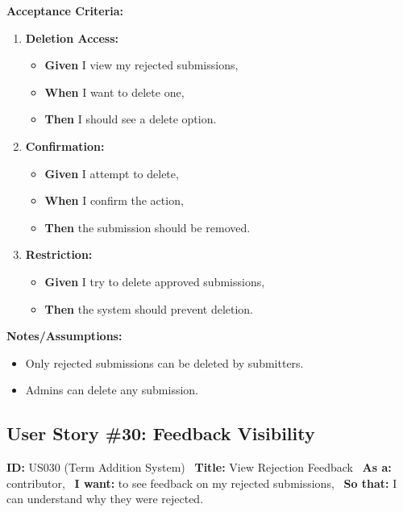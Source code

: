 \documentclass[12pt]{article}
\begin{document}
\vspace{1em}
\textbf{Acceptance Criteria:}
\begin{enumerate}
\item \textbf{Deletion Access:}
\begin{itemize}
\item \textbf{Given} I view my rejected submissions,
\item \textbf{When} I want to delete one,
\item \textbf{Then} I should see a delete option.
\end{itemize}

\item \textbf{Confirmation:}
\begin{itemize}
    \item \textbf{Given} I attempt to delete,
    \item \textbf{When} I confirm the action,
    \item \textbf{Then} the submission should be removed.
\end{itemize}

\item \textbf{Restriction:}
\begin{itemize}
    \item \textbf{Given} I try to delete approved submissions,
    \item \textbf{Then} the system should prevent deletion.
\end{itemize}
\end{enumerate}

\vspace{1em}
\textbf{Notes/Assumptions:}
\begin{itemize}
\item Only rejected submissions can be deleted by submitters.
\item Admins can delete any submission.
\end{itemize}

\subsection{User Story \#30: Feedback Visibility}
\textbf{ID:} US030 (Term Addition System) \
\textbf{Title:} View Rejection Feedback \
\textbf{As a:} contributor, \
\textbf{I want:} to see feedback on my rejected submissions, \
\textbf{So that:} I can understand why they were rejected.
\end{document}
